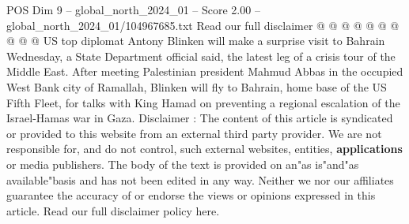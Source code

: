 \begin{textsample}{POS Dim 9 – global\_north\_2024\_01 – Score 2.00 – global\_north\_2024\_01/104967685.txt}
Read our full disclaimer @ @ @ @ @ @ @ @ @ @ US top diplomat Antony Blinken will make a surprise visit to Bahrain Wednesday, a State Department official said, the latest leg of a crisis tour of the Middle East.
After meeting Palestinian president Mahmud Abbas in the occupied West Bank city of Ramallah, Blinken will fly to Bahrain, home base of the US Fifth Fleet, for talks with King Hamad on preventing a regional escalation of the Israel-Hamas war in Gaza.
Disclaimer : The content of this article is syndicated or provided to this website from an external third party provider.
We are not responsible for, and do not control, such external websites, entities, \textbf{applications} or media publishers.
The body of the text is provided on an"as is"and"as available"basis and has not been edited in any way.
Neither we nor our affiliates guarantee the accuracy of or endorse the views or opinions expressed in this article.
Read our full disclaimer policy here.

\end{textsample}

